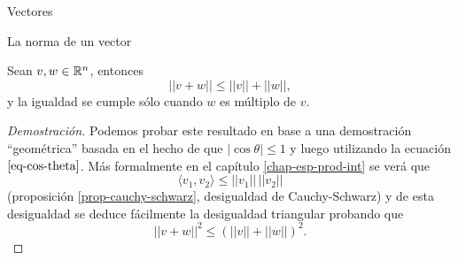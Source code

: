 \begin{chapter}{Vectores}
\begin{section}{La norma de un vector}
\begin{proposicion}
    Sean $v, w \in \mathbb R^n$, entonces
    \begin{equation*}
        ||v+w|| \le ||v||+||w||,
    \end{equation*}
    y la igualdad se cumple sólo cuando $w$ es múltiplo de $v$. 
\end{proposicion}
\begin{proof}[Demostración] Podemos probar  este resultado en base a una demostración ``geométrica'' basada en el hecho de que $|\cos\theta| \le 1 $ y luego utilizando la ecuación $\ref{eq-cos-theta}$. Más formalmente en el capítulo  \ref{chap-esp-prod-int} se verá que 
$$
\langle v_1,v_2 \rangle  \le   ||v_1|| \,  ||v_2||
$$
(proposición \ref{prop-cauchy-schwarz}, desigualdad de Cauchy-Schwarz) y de esta desigualdad se deduce fácilmente la desigualdad triangular probando que
$$
||v+w||^2 \le (||v||+||w||)^2.
$$
\begin{comment}
   Sea $v= (x_1,\ldots,x_n)$ y $w = (y_1,,\ldots,y_n)$. Luego $v+w = (x_1+ y_1,\ldots, x_n + y_n)$. Debemos probar entonces que
    \begin{equation*}
    \sqrt{\sum (x_i+ y_i)^2} \le  \sqrt{\sum x_i^2} + \sqrt{\sum y_i^2},
    \end{equation*}
    (todas las sumatoria sobre $i$). Si elevamos al cuadrado obtenemos:
    \begin{align*}
        \sum (x_i+ y_i)^2 &\le\sum x_i^2  + \sum y_i^2+ 2\sqrt{\sum x_i^2}\sqrt{\sum y_i^2}\\
        &\Updownarrow\\
        \sum  x_i^2+ y_i^2 + 2x_iy_i &\le \sum  x_i^2+ y_i^2 + 2\sqrt{\sum x_i^2}\sqrt{\sum y_i^2}\\
        &\Updownarrow\\
        \sum x_iy_i &\le \sqrt{\sum x_i^2}\sqrt{\sum y_i^2}.
    \end{align*}
    Si elevamos al cuadrado de nuevo obtenemos que
    \begin{equation*}
        ||v+w|| \le ||v||+||w|| \quad \Leftrightarrow \quad   (\sum x_iy_i)^2 \le \sum x_i^2\sum y_i^2.
    \end{equation*}

    Ahora bien
    \begin{align*}
        (\sum_i x_iy_i)^2  &= \sum_{i,j} x_iy_ix_jy_j \\
        &= \sum_i   x_iy_i x_iy_i + \sum_{i \ne j}  x_iy_ix_jy_j \\
        &= \sum_i   x_i^2y_i^2  +2 \sum_{i < j}  x_iy_ix_jy_j
    \end{align*}
\end{comment} 
\end{proof}


\end{section}
\end{chapter}
